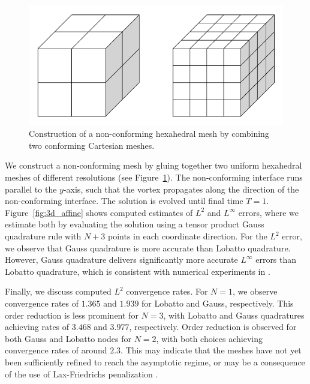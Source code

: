 \documentclass{svjour3}                     %
\begin{document}
\begin{figure}
\centering
\includegraphics[width=.65\textwidth]{figs/noncon_mesh3d.png}
\caption{Construction of a non-conforming hexahedral mesh by combining two conforming Cartesian meshes. }
\label{fig:noncon3dmesh}
\end{figure}

We construct a non-conforming mesh by gluing together two uniform hexahedral meshes of different resolutions (see Figure~\ref{fig:noncon3dmesh}).  The non-conforming interface runs parallel to the $y$-axis, such that the vortex propagates along the direction of the non-conforming interface.  The solution is evolved until final time $T=1$.  Figure~\ref{fig:3d_affine} shows computed estimates of $L^2$ and $L^{\infty}$ errors, where we estimate both by evaluating the solution using a tensor product Gauss quadrature rule with $N+3$ points in each coordinate direction.  For the $L^2$ error, we observe that Gauss quadrature is more accurate than Lobatto quadrature.  However, Gauss quadrature delivers significantly more accurate $L^\infty$ errors than Lobatto quadrature, which is consistent with numerical experiments in \cite{fernandez2019entropy}.  

Finally, we discuss computed $L^2$ convergence rates.  For $N=1$, we observe convergence rates of $1.365$ and $1.939$ for Lobatto and Gauss, respectively.  This order reduction is less prominent for $N=3$, with Lobatto and Gauss quadratures achieving rates of $3.468$ and $3.977$, respectively.  Order reduction is observed for both Gauss and Lobatto nodes for $N=2$, with both choices achieving convergence rates of around $2.3$.  This may indicate that the meshes have not yet been sufficiently refined to reach the asymptotic regime, or may be a consequence of the use of Lax-Friedrichs penalization \cite{hindenlang2019order}.  
\end{document}
